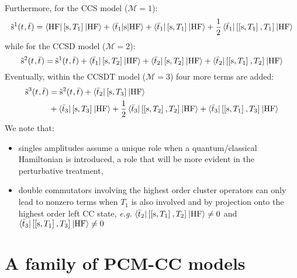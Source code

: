 Furthermore, for the \acs{CCS} model ($\mathcal{M} = 1$):
\begin{equation}
  \tilde{\mathrm{s}}^1(t_{}, \bar{t}_{}) =
  \braket{\mathrm{HF} | \left[ \mathrm{s}, T_1 \right]^{} | \mathrm{HF}}
  + \braket{\bar{t}_{1} | \mathrm{s} | \mathrm{HF}}
  + \braket{\bar{t}_{1} | \left[ \mathrm{s}, T_1 \right]^{} | \mathrm{HF}}
  + \frac{1}{2}\braket{\bar{t}_{1} | \left[ \left[ \mathrm{s}, T_1 \right]^{}, T_1 \right]^{} | \mathrm{HF}}
\end{equation}
while for the \acs{CCSD} model ($\mathcal{M} = 2$):
\begin{equation}
  \tilde{\mathrm{s}}^2(t_{}, \bar{t}_{}) =
  \tilde{\mathrm{s}}^1(t_{}, \bar{t}_{})
  + \braket{\bar{t}_{1} | \left[ \mathrm{s}, T_2 \right]^{} | \mathrm{HF}}
  + \braket{\bar{t}_{2} | \left[ \mathrm{s}, T_2 \right]^{} | \mathrm{HF}}
  + \braket{\bar{t}_{2} | \left[ \left[ \mathrm{s}, T_1 \right]^{}, T_2 \right]^{} | \mathrm{HF}}
\end{equation}
Eventually, within the \acs{CCSDT} model ($\mathcal{M} = 3$) four more
terms are added:
\begin{equation}
  \begin{aligned}
  \tilde{\mathrm{s}}^3(t_{}, \bar{t}_{}) &=
  \tilde{\mathrm{s}}^2(t_{}, \bar{t}_{})
  + \braket{\bar{t}_{2} | \left[ \mathrm{s}, T_3 \right]^{} | \mathrm{HF}} \\
  &+ \braket{\bar{t}_{3} | \left[ \mathrm{s}, T_3 \right]^{} | \mathrm{HF}}
  + \frac{1}{2}
  \braket{\bar{t}_{3} | \left[ \left[ \mathrm{s}, T_2 \right]^{}, T_2 \right]^{} |
  \mathrm{HF}}
  + \braket{\bar{t}_{3} | \left[ \left[ \mathrm{s}, T_1 \right]^{}, T_3 \right]^{} |
  \mathrm{HF}}
  \end{aligned}
\end{equation}
We note that:
\begin{itemize}
  \item singles amplitudes assume a unique role when a quantum/classical
    Hamiltonian is introduced, a role that will be more evident in the
    perturbative treatment,
  \item double commutators involving the highest order cluster
    operators can only lead to nonzero terms when $T_1$ is also
    involved and by projection onto the highest order left \acs{CC}
    state, \emph{e.g.}
    $\braket{\bar{t}_{2} | \left[ \left[ \mathrm{s}, T_1 \right]^{}, T_2 \right]^{} |
    \mathrm{HF}} \neq 0$
    and
    $\braket{\bar{t}_{3} | \left[ \left[ \mathrm{s}, T_1 \right]^{}, T_3 \right]^{} |
    \mathrm{HF}} \neq 0$
\end{itemize}

\section{A family of PCM-CC models}\label{sec:pcm-cc-models}

